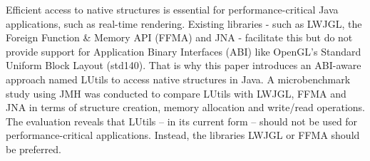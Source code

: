 Efficient access to native structures is essential for performance-critical Java applications, such as real-time rendering.
Existing libraries - such as LWJGL, the Foreign Function \& Memory API (FFMA) and JNA - facilitate this but do not provide
support for Application Binary Interfaces (ABI) like OpenGL’s Standard Uniform Block Layout (std140).
That is why this paper introduces an ABI-aware approach named LUtils to access native structures in Java.
A microbenchmark study using JMH was conducted to compare LUtils with LWJGL, FFMA and JNA in terms of structure creation,
memory allocation and write/read operations.
The evaluation reveals that LUtils – in its current form – should not be used for performance-critical applications.
Instead, the libraries LWJGL or FFMA should be preferred.
